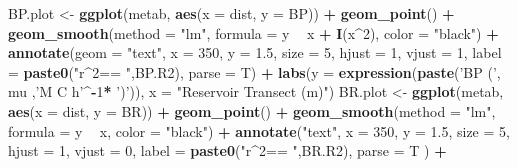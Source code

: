 \documentclass[]{article}
\newenvironment{Shaded}{\begin{snugshade}}{\end{snugshade}}
\newcommand{\DataTypeTok}[1]{\textcolor[rgb]{0.13,0.29,0.53}{#1}}
\newcommand{\DecValTok}[1]{\textcolor[rgb]{0.00,0.00,0.81}{#1}}
\newcommand{\FloatTok}[1]{\textcolor[rgb]{0.00,0.00,0.81}{#1}}
\newcommand{\KeywordTok}[1]{\textcolor[rgb]{0.13,0.29,0.53}{\textbf{#1}}}
\newcommand{\NormalTok}[1]{#1}
\newcommand{\OperatorTok}[1]{\textcolor[rgb]{0.81,0.36,0.00}{\textbf{#1}}}
\newcommand{\StringTok}[1]{\textcolor[rgb]{0.31,0.60,0.02}{#1}}
\begin{document}
\begin{Shaded}
\begin{Highlighting}[]
\NormalTok{BP.plot <-}\StringTok{ }\KeywordTok{ggplot}\NormalTok{(metab, }\KeywordTok{aes}\NormalTok{(}\DataTypeTok{x =}\NormalTok{ dist, }\DataTypeTok{y =}\NormalTok{ BP)) }\OperatorTok{+}\StringTok{ }
\StringTok{  }\KeywordTok{geom_point}\NormalTok{() }\OperatorTok{+}\StringTok{ }
\StringTok{  }\KeywordTok{geom_smooth}\NormalTok{(}\DataTypeTok{method =} \StringTok{"lm"}\NormalTok{, }\DataTypeTok{formula =}\NormalTok{ y }\OperatorTok{~}\StringTok{ }\NormalTok{x }\OperatorTok{+}\StringTok{ }\KeywordTok{I}\NormalTok{(x}\OperatorTok{^}\DecValTok{2}\NormalTok{), }\DataTypeTok{color =} \StringTok{"black"}\NormalTok{) }\OperatorTok{+}
\StringTok{  }\KeywordTok{annotate}\NormalTok{(}\DataTypeTok{geom =} \StringTok{"text"}\NormalTok{, }\DataTypeTok{x =} \DecValTok{350}\NormalTok{, }\DataTypeTok{y =} \FloatTok{1.5}\NormalTok{, }\DataTypeTok{size =} \DecValTok{5}\NormalTok{, }\DataTypeTok{hjust =} \DecValTok{1}\NormalTok{, }\DataTypeTok{vjust =} \DecValTok{1}\NormalTok{,}
           \DataTypeTok{label =} \KeywordTok{paste0}\NormalTok{(}\StringTok{"r^2== "}\NormalTok{,BP.R2), }\DataTypeTok{parse =}\NormalTok{ T) }\OperatorTok{+}
\StringTok{  }\KeywordTok{labs}\NormalTok{(}\DataTypeTok{y =} \KeywordTok{expression}\NormalTok{(}\KeywordTok{paste}\NormalTok{(}\StringTok{'BP ('}\NormalTok{, mu ,}\StringTok{'M C h'}\OperatorTok{^-}\DecValTok{1}\OperatorTok{*}\StringTok{ ')'}\NormalTok{)), }
       \DataTypeTok{x =} \StringTok{"Reservoir Transect (m)"}\NormalTok{)}
\NormalTok{BR.plot <-}\StringTok{ }\KeywordTok{ggplot}\NormalTok{(metab, }\KeywordTok{aes}\NormalTok{(}\DataTypeTok{x =}\NormalTok{ dist, }\DataTypeTok{y =}\NormalTok{ BR)) }\OperatorTok{+}\StringTok{ }
\StringTok{  }\KeywordTok{geom_point}\NormalTok{() }\OperatorTok{+}\StringTok{ }
\StringTok{  }\KeywordTok{geom_smooth}\NormalTok{(}\DataTypeTok{method =} \StringTok{"lm"}\NormalTok{, }\DataTypeTok{formula =}\NormalTok{ y }\OperatorTok{~}\StringTok{ }\NormalTok{x, }\DataTypeTok{color =} \StringTok{"black"}\NormalTok{) }\OperatorTok{+}\StringTok{ }
\StringTok{  }\KeywordTok{annotate}\NormalTok{(}\StringTok{"text"}\NormalTok{, }\DataTypeTok{x =} \DecValTok{350}\NormalTok{, }\DataTypeTok{y =} \FloatTok{1.5}\NormalTok{, }\DataTypeTok{size =} \DecValTok{5}\NormalTok{, }\DataTypeTok{hjust =} \DecValTok{1}\NormalTok{, }\DataTypeTok{vjust =} \DecValTok{0}\NormalTok{,}
           \DataTypeTok{label =} \KeywordTok{paste0}\NormalTok{(}\StringTok{"r^2== "}\NormalTok{,BR.R2), }\DataTypeTok{parse =}\NormalTok{ T ) }\OperatorTok{+}

\end{Highlighting}
\end{Shaded}
\end{document}
